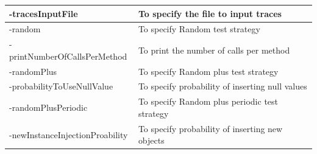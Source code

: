 \begin{center}
\begin{table}[H]
{{\begin{tabular}{|l|l|}
-tracesInputFile					&To specify the file to input traces 					\\ \hline
-random						&To specify Random test strategy					\\ \hline
-printNumberOfCallsPerMethod	&To print the number of calls per method			\\ \hline
-randomPlus						&To specify Random plus test strategy				\\ \hline
-probabilityToUseNullValue		&To specify probability of inserting null values		\\ \hline
-randomPlusPeriodic				&To specify Random plus periodic test strategy		\\ \hline
-newInstanceInjectionProability	&To specify probability of inserting new objects		\\ \hline

\hline %
\end{tabular}
}}
\bigskip
\label{table:cliOptions} %
\end{table}
\end{center}

